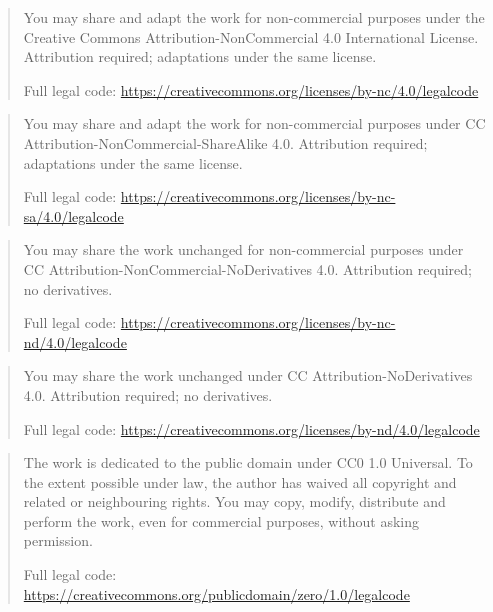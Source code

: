 \expandafter\def\csname qthesis@licensetext@CC-BY-NC-4.0\endcsname{%
  \begin{quote}\small\raggedright
    You may share and adapt the work for non-commercial purposes under the Creative Commons Attribution-NonCommercial 4.0 International License. Attribution required; adaptations under the same license.

    Full legal code: \url{https://creativecommons.org/licenses/by-nc/4.0/legalcode}
  \end{quote}%
}
\expandafter\def\csname qthesis@licensetext@CC-BY-NC-SA-4.0\endcsname{%
  \begin{quote}\small\raggedright
    You may share and adapt the work for non-commercial purposes under CC Attribution-NonCommercial-ShareAlike 4.0. Attribution required; adaptations under the same license.

    Full legal code: \url{https://creativecommons.org/licenses/by-nc-sa/4.0/legalcode}
  \end{quote}%
}
\expandafter\def\csname qthesis@licensetext@CC-BY-NC-ND-4.0\endcsname{%
  \begin{quote}\small\raggedright
    You may share the work unchanged for non-commercial purposes under CC Attribution-NonCommercial-NoDerivatives 4.0. Attribution required; no derivatives.

    Full legal code: \url{https://creativecommons.org/licenses/by-nc-nd/4.0/legalcode}
  \end{quote}%
}
\expandafter\def\csname qthesis@licensetext@CC-BY-ND-4.0\endcsname{%
  \begin{quote}\small\raggedright
    You may share the work unchanged under CC Attribution-NoDerivatives 4.0. Attribution required; no derivatives.

    Full legal code: \url{https://creativecommons.org/licenses/by-nd/4.0/legalcode}
  \end{quote}%
}
\expandafter\def\csname qthesis@licensetext@CC0-1.0\endcsname{%
  \begin{quote}\small\raggedright
    The work is dedicated to the public domain under CC0 1.0 Universal. To the extent possible under law, the author has waived all copyright and related or neighbouring rights. You may copy, modify, distribute and perform the work, even for commercial purposes, without asking permission.

    Full legal code: \url{https://creativecommons.org/publicdomain/zero/1.0/legalcode}
  \end{quote}%
}

